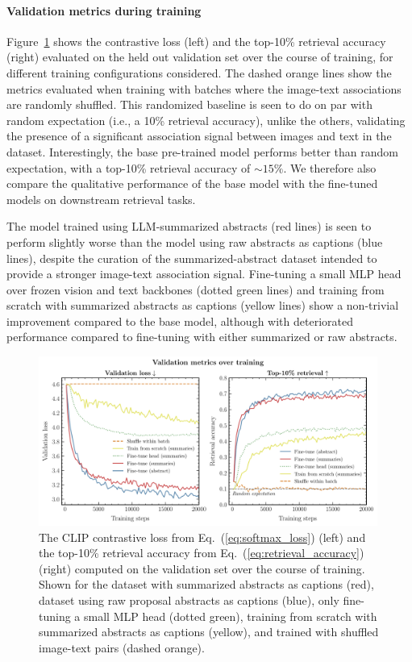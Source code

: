 \documentclass[10pt]{article} %
\newcommand{\eqrefb}[1]{(\ref{#1})}
\begin{document}
\paragraph*{Validation metrics during training}

Figure~\ref{fig:retrieval_acc} shows the contrastive loss (left) and the top-10\% retrieval accuracy (right) evaluated on the held out validation set over the course of training, for different training configurations considered.
%
The dashed orange lines show the metrics evaluated when training with batches where the image-text associations are randomly shuffled.
%
This randomized baseline is seen to do on par with random expectation (i.e., a 10\% retrieval accuracy), unlike the others, validating the presence of a significant association signal between images and text in the dataset.
%
Interestingly, the base pre-trained model performs better than random expectation, with a top-10\% retrieval accuracy of $\sim 15\%$.
%
We therefore also compare the qualitative performance of the base model with the fine-tuned models on downstream retrieval tasks.

The model trained using LLM-summarized abstracts (red lines) is seen to perform slightly worse than the model using raw abstracts as captions (blue lines), despite the curation of the summarized-abstract dataset intended to provide a stronger image-text association signal.
%
Fine-tuning a small MLP head over frozen vision and text backbones (dotted green lines) and training from scratch with summarized abstracts as captions (yellow lines) show a non-trivial improvement compared to the base model, although with deteriorated performance compared to fine-tuning with either summarized or raw abstracts.

\begin{figure}[!h]
\includegraphics[width=0.99\textwidth]{plots/val_metrics.pdf}
\caption{The CLIP contrastive loss from Eq.~\eqrefb{eq:softmax_loss} (left) and the top-10\% retrieval accuracy from Eq.~\eqrefb{eq:retrieval_accuracy} (right) computed on the validation set over the course of training. Shown for the dataset with summarized abstracts as captions (red), dataset using raw proposal abstracts as captions (blue), only fine-tuning a small MLP head (dotted green), training from scratch with summarized abstracts as captions (yellow), and trained with shuffled image-text pairs (dashed orange).} 
\label{fig:retrieval_acc}
\end{figure}
\end{document}
